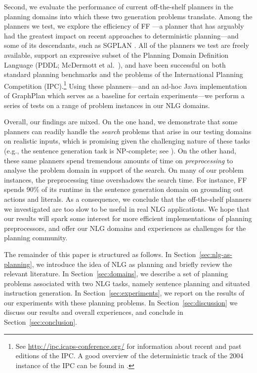 Second, we evaluate the performance of current off-the-shelf planners
in the planning domains into which these two generation problems
translate. Among the planners we test, we explore the efficiency of FF
\citep{HoffmannNebel01}---a planner that has arguably had the greatest
impact on recent approaches to deterministic planning---and some of its
descendants, such as SGPLAN
\citep{hsu06:_new_featur_in_sgplan_for}. All of the planners we test
are freely available, support an expressive subset of the Planning
Domain Definition Language (PDDL; McDermott et al.~\citeyear{PDDL}),
and have been successful on both standard planning benchmarks and the
problems of the International Planning Competition (IPC).\footnote{See
  \url{http://ipc.icaps-conference.org/} for information about recent
  and past editions of the IPC. A good overview of the deterministic
  track of the 2004 instance of the IPC can be found in
  \citep{Hoffmann-Edelkamp:05}.}  Using these planners---and an ad-hoc
Java implementation of GraphPlan \citep{Blum1997} which serves as a
baseline for certain experiments---we perform a series of tests on a
range of problem instances in our NLG domains.

Overall, our findings are mixed. On the one hand, we demonstrate that
some planners can readily handle the \emph{search} problems that arise
in our testing domains on realistic inputs, which is promising given
the challenging nature of these tasks (e.g., the sentence generation
task is NP-complete; see \citealt{KolStr02}). On the other hand, these
same planners spend tremendous amounts of time on \emph{preprocessing}
to analyse the problem domain in support of the search. On many of our
problem instances, the preprocessing time overshadows the search time.
For instance, FF spends 90\% of its runtime in the sentence generation
domain on grounding out actions and literals. As a consequence, we
conclude that the off-the-shelf planners we investigated are too slow
to be useful in real NLG applications.  We hope that our results will
spark some interest for more efficient implementations of planning
preprocessors, and offer our NLG domains and experiences as challenges
for the planning community.

The remainder of this paper is structured as follows. In
Section~\ref{sec:nlg-as-planning}, we introduce the idea of NLG as
planning and briefly review the relevant literature. In
Section~\ref{sec:domains}, we describe a set of planning problems
associated with two NLG tasks, namely sentence planning and situated
instruction generation. In Section~\ref{sec:experiments}, we report on
the results of our experiments with these planning problems.  In
Section~\ref{sec:discussion} we discuss our results and overall
experiences, and conclude in Section~\ref{sec:conclusion}.


